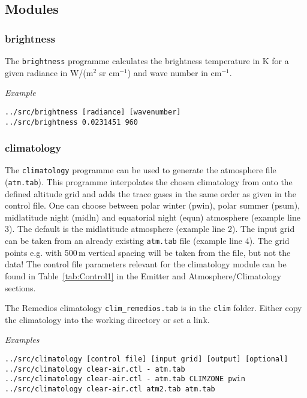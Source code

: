\subsection{Modules}

\subsubsection{brightness}
The \texttt{brightness} programme calculates the brightness temperature in K for a given radiance in W/(m$^2$ sr cm$^{-1}$) and wave number in cm$^{-1}$.

\emph{Example}\linebreak
\begin{verbatim}
../src/brightness [radiance] [wavenumber]
../src/brightness 0.0231451 960
\end{verbatim}

\subsubsection{climatology}
\label{sec:ModuleClimatology}
The \texttt{climatology} programme can be used to generate the atmosphere file (\texttt{atm.tab}). This programme interpolates the chosen climatology from \citet{Remedios2007} onto the defined altitude grid and adds the trace gases in the same order as given in the control file. One can choose between polar winter (pwin), polar summer (psum), midlatitude night (midln) and equatorial night (equn) atmosphere (example line 3). The default is the midlatitude atmosphere (example line 2). The input grid can be taken from an already existing \texttt{atm.tab} file (example line 4). The grid points e.g. with 500\,m vertical spacing will be taken from the file, but not the data! The control file parameters relevant for the climatology module can be found in Table~\ref{tab:Control1} in the Emitter and Atmosphere/Climatology sections.

The Remedios climatology \texttt{clim\_remedios.tab} is in the \texttt{clim} folder. Either copy the climatology into the working directory or set a link.

\emph{Examples}\linebreak
\begin{verbatim}
../src/climatology [control file] [input grid] [output] [optional]
../src/climatology clear-air.ctl - atm.tab
../src/climatology clear-air.ctl - atm.tab CLIMZONE pwin
../src/climatology clear-air.ctl atm2.tab atm.tab
\end{verbatim}

